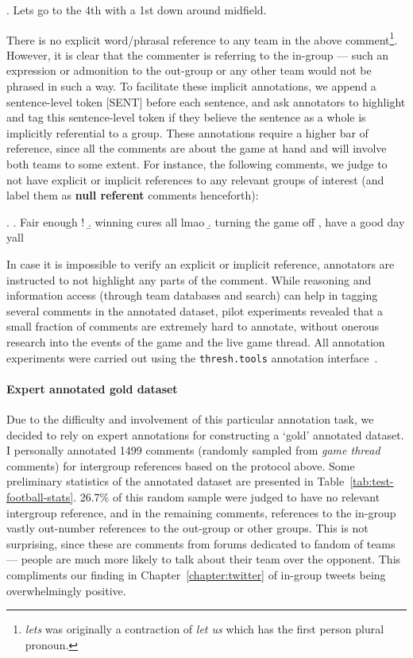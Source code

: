 \ex. Lets go to the 4th with a 1st down around midfield.

There is no explicit word/phrasal reference to any team in the above comment\footnote{\emph{lets} was originally a contraction of \emph{let us} which has the first person plural pronoun.}. However, it is clear that the commenter is referring to the in-group --- such an expression or admonition to the out-group or any other team would not be phrased in such a way. To facilitate these implicit annotations, we append a sentence-level token [SENT] before each sentence, and ask annotators to highlight and tag this sentence-level token if they believe the sentence as a whole is implicitly referential to a group. These annotations require a higher bar of reference, since all the comments are about the game at hand and will involve both teams to some extent. For instance, the following comments, we judge to not have explicit or implicit references to any relevant groups of interest (and label them as \textbf{null referent} comments henceforth):

\ex. \a. Fair enough !
     \b. winning cures all lmao
     \b. turning the game off , have a good day yall
     
In case it is impossible to verify an explicit or implicit reference, annotators are instructed to not highlight any parts of the comment. While reasoning and information access (through team databases and search) can help in tagging several comments in the annotated dataset, pilot experiments revealed that a small fraction of comments are extremely hard to annotate, without onerous research into the events of the game and the live game thread. All annotation experiments were carried out using the \texttt{thresh.tools} annotation interface~\citep{heineman2023thresh}.

\paragraph{Expert annotated gold dataset} Due to the difficulty and involvement of this particular annotation task, we decided to rely on expert annotations for constructing a `gold' annotated dataset. I personally annotated 1499 comments (randomly sampled from \emph{game thread} comments) for intergroup references based on the protocol above. Some preliminary statistics of the annotated dataset are presented in Table~\ref{tab:test-football-stats}. 26.7\% of this random sample were judged to have no relevant intergroup reference, and in the remaining comments, references to the in-group vastly out-number references to the out-group or other groups. This is not surprising, since these are comments from forums dedicated to fandom of teams --- people are much more likely to talk about their team over the opponent. This compliments our finding in Chapter~\ref{chapter:twitter} of in-group tweets being overwhelmingly positive.

